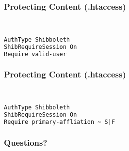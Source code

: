\begin{frame}[fragile]
\frametitle{Protecting Content (.htaccess)}
 \\
\begin{lstlisting}[language=XML,basicstyle=\ttfamily \small]
AuthType Shibboleth
ShibRequireSession On
Require valid-user
\end{lstlisting}
\end{frame}

\begin{frame}[fragile]
\frametitle{Protecting Content (.htaccess)}
 \\
\begin{lstlisting}[language=XML,basicstyle=\ttfamily \small]
AuthType Shibboleth
ShibRequireSession On
Require primary-affliation ~ S|F
\end{lstlisting}
\end{frame}

\begin{frame}
\frametitle{Questions?}
\end{frame}


